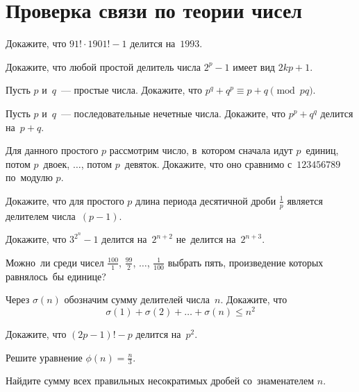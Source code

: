 
\section*{Проверка связи по теории чисел}

\begin{problems}

\item
Докажите, что $91! \cdot 1901! - 1$ делится на~$1993$.

\item
Докажите, что любой простой делитель числа $2^{p} - 1$ имеет вид $2 k p + 1$.

\item
Пусть $p$ и~$q$~--- простые числа.
Докажите, что $p^q + q^p \equiv p + q \pmod{pq}$.

\item
Пусть $p$ и~$q$~--- последовательные нечетные числа.
Докажите, что $p^p + q^q$ делится на~$p + q$.

\item
Для данного простого $p$ рассмотрим число, в~котором сначала идут $p$~единиц,
потом $p$~двоек, $\ldots$, потом $p$~девяток.
Докажите, что оно сравнимо с~$123456789$ по~модулю $p$.

\item
Докажите, что для простого $p$ длина периода десятичной дроби $\frac{1}{p}$
является делителем числа~$(p - 1)$.

\item
Докажите, что $3^{2^n} - 1$
\quad
\sp делится на~$2^{n + 2}$
\quad
\sp не~делится на~$2^{n + 3}$.

\item
Можно~ли среди чисел $\frac{100}{1}$, $\frac{99}{2}$, $\ldots$, $\frac{1}{100}$
выбрать пять, произведение которых равнялось~бы единице?

\item
Через $\sigma(n)$ обозначим сумму делителей числа~$n$.
Докажите, что
\[
    \sigma(1) + \sigma(2) + \ldots + \sigma(n)
\leq
    n^2
\]



\item
Докажите, что $(2 p - 1)! - p$ делится на~$p^2$.

\item
Решите уравнение $\phi(n) = \frac{n}{3}$.

\item
Найдите сумму всех правильных несократимых дробей со~знаменателем $n$.

\end{problems}

